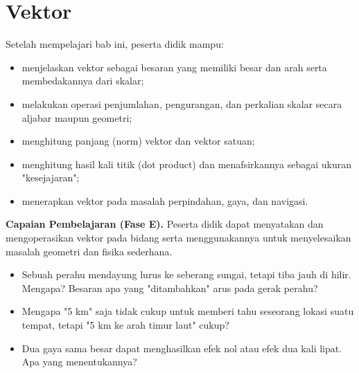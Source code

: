 \documentclass[11pt,a4paper]{report}
\theoremstyle{gaya}
\begin{document}
\chapter{Vektor}
\begin{tujuan}
Setelah mempelajari bab ini, peserta didik mampu:
\begin{itemize}[leftmargin=*,topsep=2pt]
  \item menjelaskan vektor sebagai besaran yang memiliki besar dan arah serta membedakannya dari skalar;
  \item melakukan operasi penjumlahan, pengurangan, dan perkalian skalar secara aljabar maupun geometri;
  \item menghitung panjang (norm) vektor dan vektor satuan;
  \item menghitung hasil kali titik (dot product) dan menafsirkannya sebagai ukuran "kesejajaran";
  \item menerapkan vektor pada masalah perpindahan, gaya, dan navigasi.
\end{itemize}
\textbf{Capaian Pembelajaran (Fase E).} Peserta didik dapat menyatakan dan mengoperasikan vektor pada bidang serta menggunakannya untuk menyelesaikan masalah geometri dan fisika sederhana.
\end{tujuan}

\begin{pemantik}
\begin{itemize}[leftmargin=*,topsep=2pt]
  \item Sebuah perahu mendayung lurus ke seberang sungai, tetapi tiba jauh di hilir. Mengapa? Besaran apa yang "ditambahkan" arus pada gerak perahu?
  \item Mengapa "5 km" saja tidak cukup untuk memberi tahu seseorang lokasi suatu tempat, tetapi "5 km ke arah timur laut" cukup?
  \item Dua gaya sama besar dapat menghasilkan efek nol atau efek dua kali lipat. Apa yang menentukannya?
\end{itemize}
\end{pemantik}
\end{document}
